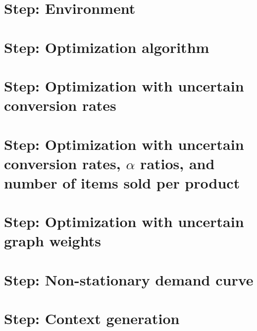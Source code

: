 \documentclass{article}
\begin{document}
\section{Step: Environment}



\newpage
\section{Step: Optimization algorithm}



\newpage
\section{Step: Optimization with uncertain conversion rates}



\newpage
\section{Step: Optimization with uncertain conversion rates, $\alpha$ ratios, and number of items sold per product}


\newpage
\section{Step: Optimization with uncertain graph weights}


\newpage
\section{Step: Non-stationary demand curve}


\newpage
\section{Step: Context generation}

\end{document}
